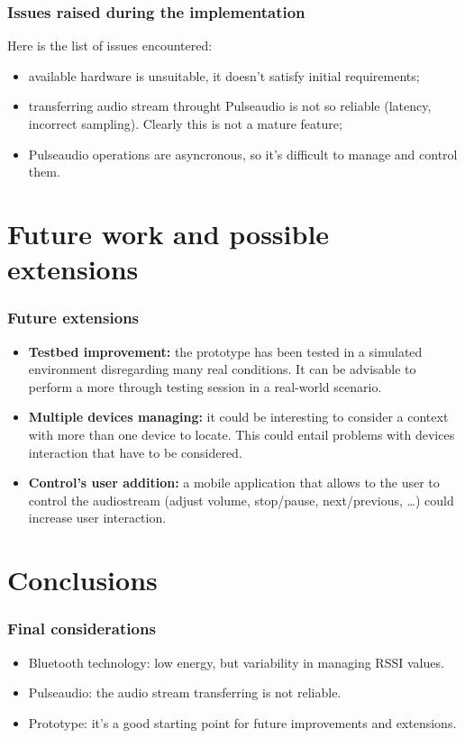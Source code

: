 \documentclass{beamer}
\begin{document}
	\begin{frame}
		\frametitle{Issues raised during the implementation}
		Here is the list of issues encountered:
		\begin{itemize}
		\item available hardware is unsuitable, it doesn't satisfy initial requirements;
		\item transferring audio stream throught Pulseaudio is not so reliable (latency, incorrect sampling). Clearly this is not a mature feature; 
		\item Pulseaudio operations are asyncronous, so it's difficult to manage and control them.
		\end{itemize}
	\end{frame}
	

\section{Future work and possible extensions}

	
	\begin{frame}
		\frametitle{Future extensions}
		\begin{itemize}
		\item \textbf{Testbed improvement:} the prototype has been tested in a simulated environment disregarding many real conditions. It can be advisable to perform a more through testing session in a real-world scenario. 
		\pause
		\item \textbf{Multiple devices managing:} it could be interesting to consider a context with more than one device to locate. This could entail problems with devices interaction that have to be considered.
		\pause
		\item \textbf{Control's user addition:} a mobile application that allows to the user to control the audiostream (adjust volume, stop/pause, next/previous, \ldots) could increase user interaction.
		\end{itemize}
	\end{frame}
	

\section{Conclusions}
	\begin{frame}
		\frametitle{Final considerations}
		\begin{itemize}
		\item Bluetooth technology: low energy, but variability in managing RSSI values.  
		\item Pulseaudio: the audio stream transferring is not reliable.
		\item Prototype: it's a good starting point for future improvements and extensions.
		\end{itemize}
	\end{frame}
\end{document}
